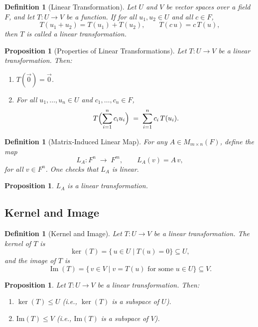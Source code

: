 \documentclass[12pt]{article}
\theoremstyle{break}             %
\newtheorem{prop}[thm]{Proposition}%
\newtheorem{defn}[thm]{Definition}
\begin{document}
\begin{defn}[Linear Transformation]
Let $U$ and $V$ be vector spaces over a field $F$, and let $T\colon U\to V$ be a function.  If for all $u_1,u_2\in U$ and all $c\in F$,
\[
T(u_1+u_2)=T(u_1)+T(u_2),
\qquad
T(c\,u)=c\,T(u),
\]
then $T$ is called a \emph{linear transformation}.
\end{defn}

\begin{prop}[Properties of Linear Transformations]
Let \(T : U \to V\) be a linear transformation. Then:
\begin{enumerate}
\item \(T(\vec{0}) = \vec{0}\).
\item For all \(u_1, \dots, u_n \in U\) and \(c_1, \dots, c_n \in F\),
\[
T\Bigl(\sum_{i=1}^n c_i u_i\Bigr) 
\;=\; \sum_{i=1}^n c_i \, T(u_i).
\]
\end{enumerate}
\end{prop}

\begin{defn}[Matrix‐Induced Linear Map]
For any $A\in M_{m\times n}(F)$, define the map
\[
L_A\colon F^n \;\longrightarrow\; F^m,
\qquad
L_A(v)=A\,v,
\]
for all $v\in F^n$.  One checks that $L_A$ is linear.
\end{defn}

\begin{prop}
\(L_A\) is a linear transformation.
\end{prop}

\subsection{Kernel and Image}

\begin{defn}[Kernel and Image]
Let $T\colon U\to V$ be a linear transformation.  The \emph{kernel} of $T$ is
\[
\ker(T)=\{\,u\in U\mid T(u)=0\}\subseteq U,
\]
and the \emph{image} of $T$ is
\[
\operatorname{Im}(T)=\{\,v\in V\mid v=T(u)\text{ for some }u\in U\}\subseteq V.
\]
\end{defn}

\begin{prop}
Let \(T : U \to V\) be a linear transformation. Then:
\begin{enumerate}
\item \(\ker(T) \le U\) (i.e., \(\ker(T)\) is a subspace of \(U\)).
\item \(\mathrm{Im}(T) \le V\) (i.e., \(\mathrm{Im}(T)\) is a subspace of \(V\)).
\end{enumerate}
\end{prop}
\end{document}
